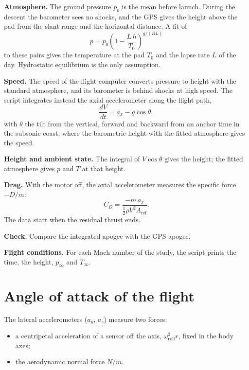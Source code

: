 \begin{steps}
\item \textbf{Atmosphere.} The ground pressure $p_0$ is the mean before launch. During
  the descent the barometer sees no shocks, and the GPS gives the height above the pad
  from the slant range and the horizontal distance. A fit of
  \[
    p = p_0\left(1 - \frac{L\,h}{T_0}\right)^{g/(R L)}
  \]
  to these pairs gives the temperature at the pad $T_0$ and the lapse rate $L$ of the
  day. Hydrostatic equilibrium is the only assumption.
\item \textbf{Speed.} The speed of the flight computer converts pressure to height with
  the standard atmosphere, and its barometer is behind shocks at high speed. The script
  integrates instead the axial accelerometer along the flight path,
  \[
    \frac{dV}{dt} = a_x - g\cos\theta,
  \]
  with $\theta$ the tilt from the vertical, forward and backward from an anchor time in
  the subsonic coast, where the barometric height with the fitted atmosphere gives the
  speed.
\item \textbf{Height and ambient state.} The integral of $V\cos\theta$ gives the
  height; the fitted atmosphere gives $p$ and $T$ at that height.
\item \textbf{Drag.} With the motor off, the axial accelerometer measures the specific
  force $-D/m$:
  \[
    C_D = \frac{-m\,a_x}{\tfrac12\rho V^2 A_\text{ref}}.
  \]
  The data start when the residual thrust ends.
\item \textbf{Check.} Compare the integrated apogee with the GPS apogee.
\item \textbf{Flight conditions.} For each Mach number of the study, the script prints
  the time, the height, $p_\infty$ and $T_\infty$.
\end{steps}

\section{Angle of attack of the flight}\label{sec:flight-alpha}

The lateral accelerometers ($a_y$, $a_z$) measure two forces:

\begin{itemize}
\item a centripetal acceleration of a sensor off the axis, $\omega_\text{roll}^2 r$,
  fixed in the body axes;
\item the aerodynamic normal force $N/m$.
\end{itemize}

